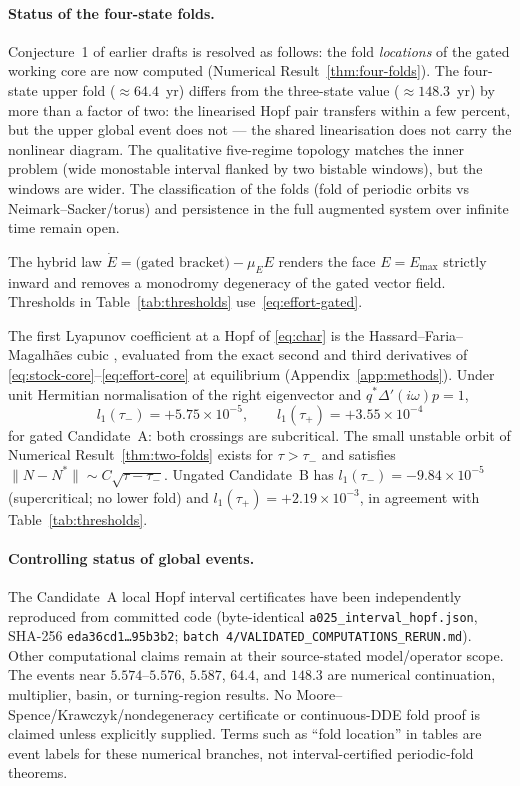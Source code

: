 \documentclass[11pt]{article}
\theoremstyle{definition}
\begin{document}
\paragraph{Status of the four-state folds.} Conjecture~1 of earlier drafts is resolved as follows: the fold \emph{locations} of the gated working core are now computed (Numerical Result~\ref{thm:four-folds}). The four-state upper fold ($\approx 64.4$~yr) differs from the three-state value ($\approx 148.3$~yr) by more than a factor of two: the linearised Hopf pair transfers within a few percent, but the upper global event does not --- the shared linearisation does not carry the nonlinear diagram. The qualitative five-regime topology matches the inner problem (wide monostable interval flanked by two bistable windows), but the windows are wider. The classification of the folds (fold of periodic orbits vs Neimark--Sacker/torus) and persistence in the full augmented system over infinite time remain open.

The hybrid law $\dot E=\text{(gated bracket)}-\mu_E E$ renders the face $E=E_{\max}$ strictly inward and removes a monodromy degeneracy of the gated vector field. Thresholds in Table~\ref{tab:thresholds} use~\eqref{eq:effort-gated}.

The first Lyapunov coefficient at a Hopf of \eqref{eq:char} is the Hassard--Faria--Magalhães cubic \cite{faria1995,hassard1981,guckenheimer1983}, evaluated from the exact second and third derivatives of \eqref{eq:stock-core}--\eqref{eq:effort-core} at equilibrium (Appendix~\ref{app:methods}). Under unit Hermitian normalisation of the right eigenvector and $q^*\Delta'(i\omega)p=1$,
\[
l_1(\tau_-)=+5.75\times 10^{-5},\qquad l_1(\tau_+)=+3.55\times 10^{-4}
\]
for gated Candidate~A: both crossings are subcritical. The small unstable orbit of Numerical Result~\ref{thm:two-folds} exists for $\tau>\tau_-$ and satisfies $\|N-N^*\|\sim C\sqrt{\tau-\tau_-}$. Ungated Candidate~B has $l_1(\tau_-)=-9.84\times 10^{-5}$ (supercritical; no lower fold) and $l_1(\tau_+)=+2.19\times 10^{-3}$, in agreement with Table~\ref{tab:thresholds}.


\paragraph{Controlling status of global events.}
The Candidate~A local Hopf interval certificates have been independently reproduced from committed code (byte-identical \texttt{a025\_interval\_hopf.json}, SHA-256 \texttt{eda36cd1\ldots95b3b2}; \texttt{batch 4/VALIDATED\_COMPUTATIONS\_RERUN.md}). Other computational claims remain at their source-stated model/operator scope. The events near $5.574$--$5.576$, $5.587$, $64.4$, and $148.3$ are numerical continuation, multiplier, basin, or turning-region results. No Moore--Spence/Krawczyk/nondegeneracy certificate or continuous-DDE fold proof is claimed unless explicitly supplied. Terms such as ``fold location'' in tables are event labels for these numerical branches, not interval-certified periodic-fold theorems.
\end{document}
